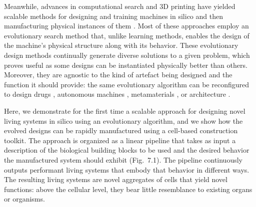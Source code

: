 Meanwhile, advances in computational search and 3D printing have yielded scalable methods for designing and training machines in silico \cite{sims1994competition,cheney2018scalable} and then manufacturing physical instances of them \cite{lipson2000automatic,bongard2006resilient,cellucci20171d}. 
Most of these approaches employ an evolutionary search method \cite{munk2015topology} that, unlike learning methods, enables the design of the machine's physical structure along with its behavior. 
These evolutionary design methods continually generate diverse solutions to a given problem, which proves useful as some designs can be instantiated physically better than others. 
Moreover, they are agnostic to the kind of artefact being designed and the function it should provide: the same evolutionary algorithm can be reconfigured to design drugs \cite{devi2015evolutionary}, autonomous machines \cite{lipson2000automatic,cellucci20171d}, metamaterials \cite{huntington2014subwavelength}, or architecture \cite{mueller2015combining}. 

Here, we demonstrate for the first time a scalable approach for designing novel living systems in silico using an evolutionary algorithm, and we show how the evolved designs can be rapidly manufactured using a cell-based construction toolkit. 
The approach is organized as a linear pipeline that takes as input a description of the biological building blocks to be used and the desired behavior the manufactured system should exhibit (Fig.~7.1). 
The pipeline continuously outputs performant living systems that embody that behavior in different ways. The resulting living systems are novel aggregates of cells that yield novel functions: above the cellular level, they bear little resemblance to existing organs or organisms.


